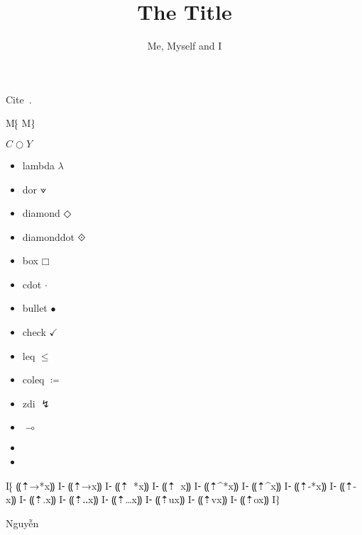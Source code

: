 \documentclass{article}
\title{The Title}
\author{Me, Myself and I}
\begin{document}
\maketitle

Cite~\citep{darais-icfp17}.

M⁅ 
  \overset\circ\prime
M⁆

$C ○ Y$

\begin{itemize}
   \item lambda $λ$ 
   \item dor $⟇$
   \item diamond $◇$
   \item diamonddot $⟐$
   \item box $□$
   \item cdot $⋅$
   \item bullet $•$
   \item check $✓$
   \item leq $≤$
   \item coleq $≔ $
   \item zdi $↯$
   \item $⊸$
\end{itemize}

\begin{itemize}
  \item \lipsum[1-2]
  \item \lipsum[2-4]
\end{itemize}

I⁅ ⸨⇡→*{x}⸩
I⁃ ⸨⇡→{x}⸩
I⁃ ⸨⇡~*{x}⸩
I⁃ ⸨⇡~{x}⸩
I⁃ ⸨⇡^*{x}⸩
I⁃ ⸨⇡^{x}⸩
I⁃ ⸨⇡-*{x}⸩
I⁃ ⸨⇡-{x}⸩
I⁃ ⸨⇡.{x}⸩
I⁃ ⸨⇡‥{x}⸩
I⁃ ⸨⇡…{x}⸩
I⁃ ⸨⇡u{x}⸩
I⁃ ⸨⇡v{x}⸩
I⁃ ⸨⇡o{x}⸩
I⁆

Nguyễn





\end{document}
